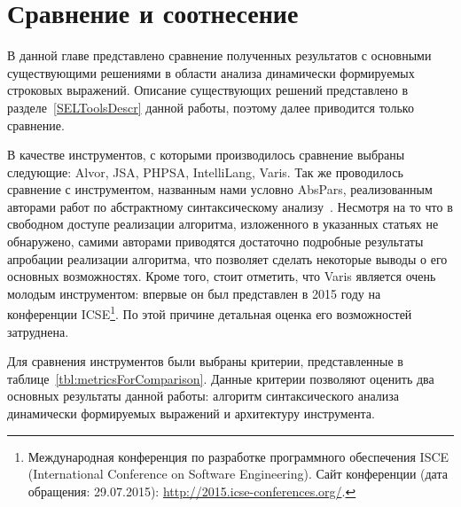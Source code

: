 \chapter{Сравнение и соотнесение} \label{chaptComp}

В данной главе представлено сравнение полученных результатов с основными существующими решениями в области анализа динамически формируемых строковых выражений. Описание существующих решений представлено 
в разделе~\ref{SELToolsDescr} данной работы, поэтому далее приводится только сравнение.

В качестве инструментов, с которыми производилось сравнение выбраны следующие: Alvor, JSA, PHPSA, IntelliLang, Varis. Так же проводилось сравнение с инструментом, названным нами 
условно AbsPars, реализованным авторами работ по абстрактному синтаксическому анализу~\cite{LrAbstract1, LrAbstract2, LRAbstractParsingSema}. Несмотря на то что в свободном доступе реализации 
алгоритма, изложенного в указанных статьях не обнаружено, самими авторами приводятся достаточно подробные результаты апробации реализации алгоритма, что позволяет сделать некоторые выводы о его 
основных возможностях. Кроме того, стоит отметить, что Varis является очень молодым инструментом: впервые он был представлен в 2015 году на конференции ICSE\footnote{Международная конференция по 
разработке программного обеспечения ISCE (International Conference on Software Engineering). Сайт конференции (дата обращения: 29.07.2015): \url{http://2015.icse-conferences.org/}.}. По этой причине детальная оценка его возможностей затруднена. 

Для сравнения инструментов были выбраны критерии, представленные в таблице~\ref{tbl:metricsForComparison}. Данные критерии позволяют оценить два основных результаты данной работы: алгоритм синтаксического анализа динамически 
формируемых выражений и архитектуру инструмента. 

